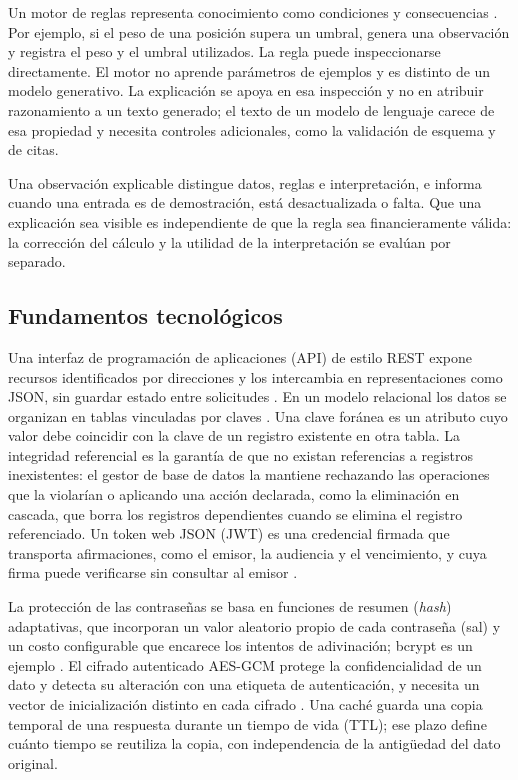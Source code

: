 Un motor de reglas representa conocimiento como condiciones y consecuencias \parencite{HayesRoth1985}. Por ejemplo, si el peso de una posición supera un umbral, genera una observación y registra el peso y el umbral utilizados. La regla puede inspeccionarse directamente. El motor no aprende parámetros de ejemplos y es distinto de un modelo generativo. La explicación se apoya en esa inspección y no en atribuir razonamiento a un texto generado; el texto de un modelo de lenguaje carece de esa propiedad y necesita controles adicionales, como la validación de esquema y de citas.

Una observación explicable distingue datos, reglas e interpretación, e informa cuando una entrada es de demostración, está desactualizada o falta. Que una explicación sea visible es independiente de que la regla sea financieramente válida: la corrección del cálculo y la utilidad de la interpretación se evalúan por separado.

\subsection{Fundamentos tecnológicos}\label{subsec:fundamentos-tecnologicos}

Una interfaz de programación de aplicaciones (API) de estilo REST expone recursos identificados por direcciones y los intercambia en representaciones como JSON, sin guardar estado entre solicitudes \parencite{Fielding2000}. En un modelo relacional los datos se organizan en tablas vinculadas por claves \parencite{Codd1970}. Una clave foránea es un atributo cuyo valor debe coincidir con la clave de un registro existente en otra tabla. La integridad referencial es la garantía de que no existan referencias a registros inexistentes: el gestor de base de datos la mantiene rechazando las operaciones que la violarían o aplicando una acción declarada, como la eliminación en cascada, que borra los registros dependientes cuando se elimina el registro referenciado. Un token web JSON (JWT) es una credencial firmada que transporta afirmaciones, como el emisor, la audiencia y el vencimiento, y cuya firma puede verificarse sin consultar al emisor \parencite{RFC7519}.

La protección de las contraseñas se basa en funciones de resumen (\textit{hash}) adaptativas, que incorporan un valor aleatorio propio de cada contraseña (sal) y un costo configurable que encarece los intentos de adivinación; bcrypt es un ejemplo \parencite{ProvosMazieres1999}. El cifrado autenticado AES-GCM protege la confidencialidad de un dato y detecta su alteración con una etiqueta de autenticación, y necesita un vector de inicialización distinto en cada cifrado \parencite{Dworkin2007}. Una caché guarda una copia temporal de una respuesta durante un tiempo de vida (TTL); ese plazo define cuánto tiempo se reutiliza la copia, con independencia de la antigüedad del dato original.

